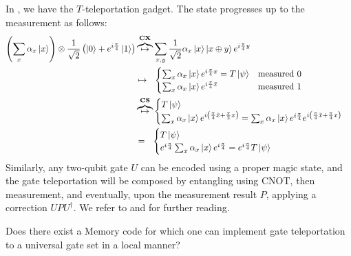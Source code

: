 \documentclass[manuscript,screen,review]{acmart}
\begin{document}
{In , we have the $T$-teleportation gadget. The state progresses up to the measurement as follows:
\begin{equation*}
    \begin{split}
        \left(\sum_{x}\alpha_{x}\ket{x}\right)\otimes\frac{1}{\sqrt{2}} \left(  \ket{0} + e^{i\frac{\pi}{4}}\ket{1}\right) & \overbrace{  \mapsto }^{ \textbf{CX} } \sum_{x,y}\frac{1}{\sqrt{2}}\alpha_{x}\ket{x}\ket{x\oplus y}e^{i\frac{\pi}{4} y} \\ 
        & \mapsto \ \ \begin{cases}
         \sum_{x}\alpha_x\ket{x}e^{i\frac{\pi}{4}x} = T\ket{\psi}   & \text{measured } 0 \\
           \sum_{x}\alpha_x\ket{x}e^{i\frac{\pi}{4}\bar{x}} & \text{measured } 1
        \end{cases} \\ 
        & \overbrace{  \mapsto }^{ \textbf{CS} } \begin{cases}
          T\ket{\psi}    \\
           \sum_{x}\alpha_x\ket{x}e^{i\left( \frac{\pi}{4}\bar{x} + \frac{\pi}{2}x \right)} =  \sum_{x}\alpha_x\ket{x}e^{i\frac{\pi}{4}}e^{i\left( \frac{\pi}{4}\bar{x} + \frac{\pi}{4}x \right)}
        \end{cases} \\ 
        & = \ \ \begin{cases}
          T\ket{\psi}    \\
           e^{i\frac{\pi}{4} } \sum_{x}\alpha_x\ket{x}e^{i\frac{\pi}{4}} = e^{i\frac{\pi}{4} } T\ket{\psi}
        \end{cases} 
    \end{split}
\end{equation*}
Similarly, any two-qubit gate $U$ can be encoded using a proper magic state, and the gate teleportation will be composed by entangling using CNOT, then measurement, and eventually, upon the measurement result $P$, applying a correction $UPU^{\dagger}$. We refer to \cite{gottesman2014faulttolerant} and \cite{grospellier:tel-03364419} for further reading. 


\begin{oproblem}
Does there exist a Memory code for which one can implement gate teleportation to a universal gate set in a local manner?
\end{oproblem}


}
\end{document}
